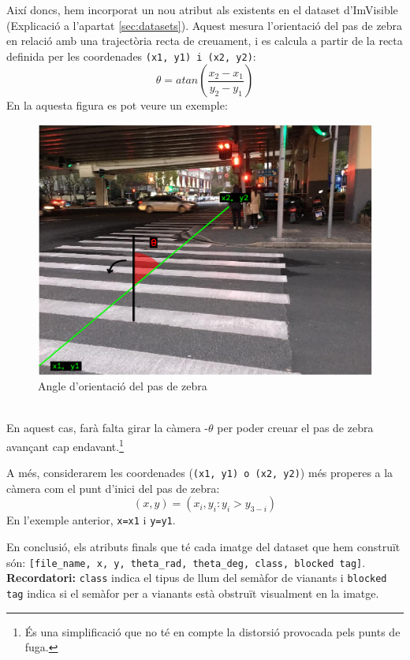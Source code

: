 \documentclass[10pt,a4paper,twocolumn,twoside]{article}
\begin{document}
Així doncs, hem incorporat un nou atribut als existents en el dataset d'ImVisible (Explicació a l'apartat \ref{sec:datasets}). Aquest mesura l’orientació del pas de zebra en relació amb una trajectòria recta de creuament, i es calcula a partir de la recta definida per les coordenades \texttt{(x1, y1) i (x2, y2)}:
\begin{equation*}
	\theta=atan(\frac{x_2-x_1}{y_2-y_1})
\end{equation*} 
En la aquesta figura es pot veure un exemple:
\begin{figure}[!h]
	\centering
	\includegraphics[width=0.95\linewidth]{figs/angle}
	\caption{Angle d'orientació del pas de zebra}
	\label{fig:angle}
\end{figure}
\\
En aquest cas, farà falta girar la càmera -$\theta$ per poder creuar el pas de zebra avançant cap endavant.\footnote{És una simplificació que no té en compte la distorsió provocada pels punts de fuga.}

A més, considerarem les coordenades (\texttt{(x1, y1) o (x2, y2)}) més properes a la càmera com el punt d'inici del pas de zebra:
\begin{equation*}
	(x, y)=(x_i, y_i : y_i > y_{3-i})
\end{equation*} 
En l'exemple anterior, \texttt{x=x1} i \texttt{y=y1}.

En conclusió, els atributs finals que té cada imatge del dataset que hem construït són: \texttt{[file\_name, x, y, theta\_rad, theta\_deg, class, blocked tag]}. \textbf{Recordatori:} \texttt{class} indica el tipus de llum del semàfor de vianants i \texttt{blocked tag} indica si el semàfor per a vianants està obstruït visualment en la imatge.
\end{document}
